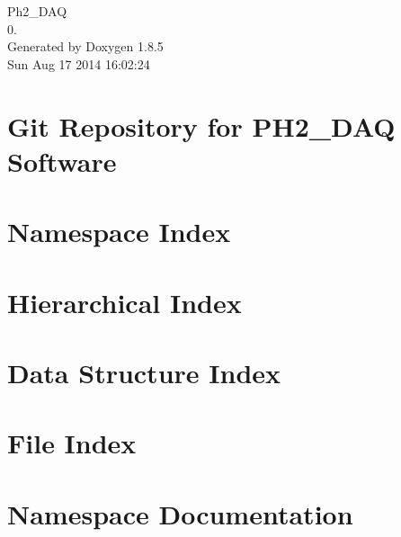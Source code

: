 \documentclass[twoside]{book}
\newcommand{\clearemptydoublepage}{%
  \newpage{\pagestyle{empty}\cleardoublepage}%
}
\begin{document}
\hypersetup{pageanchor=false}
\begin{titlepage}
\vspace*{7cm}
\begin{center}%
{\Large Ph2\-\_\-\-D\-A\-Q \\[1ex]\large 0. }\\
\vspace*{1cm}
{\large Generated by Doxygen 1.8.5}\\
\vspace*{0.5cm}
{\small Sun Aug 17 2014 16:02:24}\\
\end{center}
\end{titlepage}
\clearemptydoublepage
\tableofcontents
\clearemptydoublepage
{}
\hypersetup{pageanchor=true}

\chapter{Git Repository for P\-H2\-\_\-\-D\-A\-Q Software}
\label{md__r_e_a_d_m_e}
\hypertarget{md__r_e_a_d_m_e}{}

\chapter{Namespace Index}

\chapter{Hierarchical Index}

\chapter{Data Structure Index}

\chapter{File Index}

\chapter{Namespace Documentation}




\end{document}
